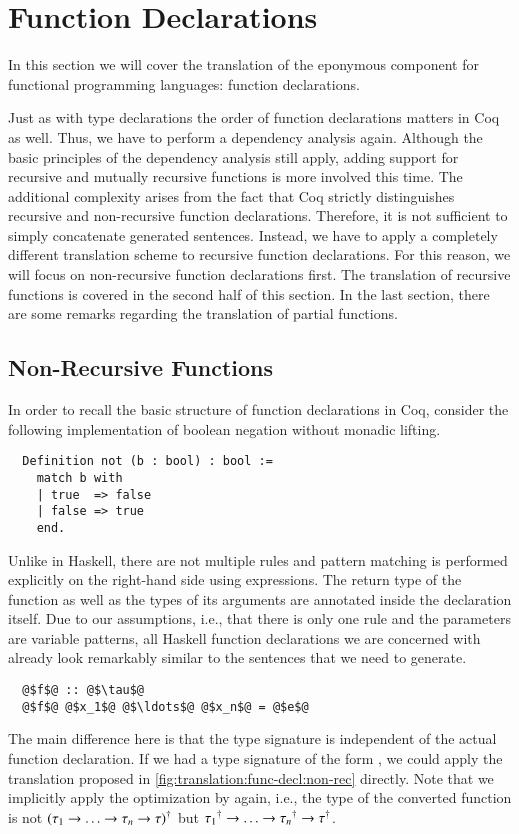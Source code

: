 \section{Function Declarations} \label{sec:translation:func-decl}
In this section we will cover the translation of the eponymous component for functional programming languages: function declarations.

Just as with type declarations the order of function declarations matters in Coq as well.
Thus, we have to perform a dependency analysis again.
Although the basic principles of the dependency analysis still apply, adding support for recursive and mutually recursive functions is more involved this time.
The additional complexity arises from the fact that Coq strictly distinguishes recursive and non-recursive function declarations.
Therefore, it is not sufficient to simply concatenate generated sentences.
Instead, we have to apply a completely different translation scheme to recursive function declarations.
For this reason, we will focus on non-recursive function declarations first.
The translation of recursive functions is covered in the second half of this section.
In the last section, there are some remarks regarding the translation of partial functions.

\subsection{Non-Recursive Functions} \label{sec:translation:func-decl:non-rec}
In order to recall the basic structure of function declarations in Coq, consider the following implementation of boolean negation without monadic lifting.
\begin{verbatim}
  Definition not (b : bool) : bool :=
    match b with
    | true  => false
    | false => true
    end.
\end{verbatim}
Unlike in Haskell, there are not multiple rules and pattern matching is performed explicitly on the right-hand side using  expressions.
The return type of the function as well as the types of its arguments are annotated inside the declaration itself.
Due to our assumptions, i.e., that there is only one rule and the parameters are variable patterns, all Haskell function declarations we are concerned with already look remarkably similar to the  sentences that we need to generate.
\begin{verbatim}
  @$f$@ :: @$\tau$@
  @$f$@ @$x_1$@ @$\ldots$@ @$x_n$@ = @$e$@
\end{verbatim}
The main difference here is that the type signature is independent of the actual function declaration.
If we had a type signature of the form , we could apply the translation proposed in \autoref{fig:translation:func-decl:non-rec} directly.
Note that we implicitly apply the optimization by \cite{Abel:2005} again, i.e.,
the type of the converted function is not ${(\tau_1 \rightarrow \ldots \rightarrow \tau_n \rightarrow \tau)}^{\dagger}$ but ${\tau_1}^{\dagger} \rightarrow \ldots \rightarrow {\tau_n}^{\dagger} \rightarrow {\tau}^{\dagger}$.

